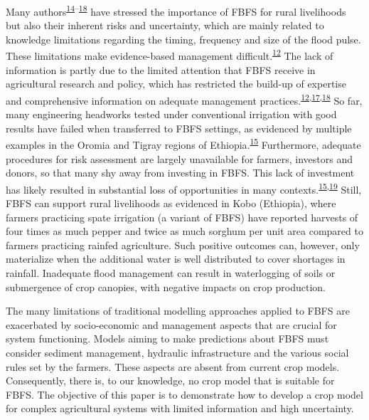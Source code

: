 \documentclass[]{elsarticle} %
\begin{document}
Many authors\textsuperscript{\protect\hyperlink{ref-Harlan_and_Pasquereau_1969}{14}--\protect\hyperlink{ref-VanSteenbergen_et_al_2011}{18}} have stressed the importance of FBFS for rural livelihoods but also their inherent risks and uncertainty, which are mainly related to knowledge limitations regarding the timing, frequency and size of the flood pulse. These limitations make evidence-based management difficult.\textsuperscript{\protect\hyperlink{ref-VanSteenbergen_et_al_2010}{12}} The lack of information is partly due to the limited attention that FBFS receive in agricultural research and policy, which has restricted the build-up of expertise and comprehensive information on adequate management practices.\textsuperscript{\protect\hyperlink{ref-VanSteenbergen_et_al_2010}{12},\protect\hyperlink{ref-Puertas_et_al_2011}{17},\protect\hyperlink{ref-VanSteenbergen_et_al_2011}{18}} So far, many engineering headworks tested under conventional irrigation with good results have failed when transferred to FBFS settings, as evidenced by multiple examples in the Oromia and Tigray regions of Ethiopia.\textsuperscript{\protect\hyperlink{ref-Erkossa_et_al_2014}{15}} Furthermore, adequate procedures for risk assessment are largely unavailable for farmers, investors and donors, so that many shy away from investing in FBFS. This lack of investment has likely resulted in substantial loss of opportunities in many contexts.\textsuperscript{\protect\hyperlink{ref-Erkossa_et_al_2014}{15},\protect\hyperlink{ref-Hardaker_et_al_2015}{19}} Still, FBFS can support rural livelihoods as evidenced in Kobo (Ethiopia), where farmers practicing spate irrigation (a variant of FBFS) have reported harvests of four times as much pepper and twice as much sorghum per unit area compared to farmers practicing rainfed agriculture. Such positive outcomes can, however, only materialize when the additional water is well distributed to cover shortages in rainfall. Inadequate flood management can result in waterlogging of soils or submergence of crop canopies, with negative impacts on crop production.

The many limitations of traditional modelling approaches applied to FBFS are exacerbated by socio-economic and management aspects that are crucial for system functioning. Models aiming to make predictions about FBFS must consider sediment management, hydraulic infrastructure and the various social rules set by the farmers. These aspects are absent from current crop models. Consequently, there is, to our knowledge, no crop model that is suitable for FBFS. The objective of this paper is to demonstrate how to develop a crop model for complex agricultural systems with limited information and high uncertainty.
\end{document}

